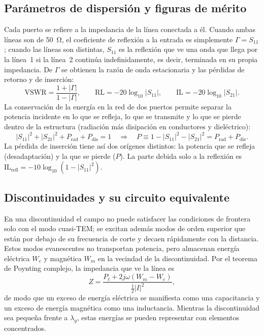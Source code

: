 \documentclass[11pt,letterpaper]{article}
\begin{document}
\subsection{Parámetros de dispersión y figuras de mérito}
\label{sec:sparam}
Cada puerto se refiere a la impedancia de la línea conectada a él. Cuando ambas líneas son de \SI{50}{\ohm}, el coeficiente de reflexión a la entrada es simplemente $\Gamma=S_{11}$; cuando las líneas son distintas, $S_{11}$ es la reflexión que ve una onda que llega por la línea~1 si la línea~2 continúa indefinidamente, es decir, terminada en su propia impedancia. De $\Gamma$ se obtienen la razón de onda estacionaria y las pérdidas de retorno y de inserción:
\begin{equation}
\mathrm{VSWR} = \frac{1+|\Gamma|}{1-|\Gamma|}, \qquad
\mathrm{RL} = -20\log_{10}|S_{11}|, \qquad
\mathrm{IL} = -20\log_{10}|S_{21}|.
\label{eq:merito}
\end{equation}
La conservación de la energía en la red de dos puertos permite separar la potencia incidente en lo que se refleja, lo que se transmite y lo que se pierde dentro de la estructura (radiación más disipación en conductores y dieléctrico):
\begin{equation}
|S_{11}|^2 + |S_{21}|^2 + P_{\mathrm{rad}} + P_{\mathrm{dis}} = 1
\quad\Longrightarrow\quad
P \equiv 1-|S_{11}|^2-|S_{21}|^2 = P_{\mathrm{rad}} + P_{\mathrm{dis}}.
\label{eq:balance}
\end{equation}
La pérdida de inserción tiene así dos orígenes distintos: la potencia que se refleja (desadaptación) y la que se pierde ($P$). La parte debida solo a la reflexión es $\mathrm{IL}_{\mathrm{refl}}=-10\log_{10}\left(1-|S_{11}|^2\right)$.

\subsection{Discontinuidades y su circuito equivalente}
En una discontinuidad el campo no puede satisfacer las condiciones de frontera solo con el modo cuasi-TEM; se excitan además modos de orden superior que están por debajo de su frecuencia de corte y decaen rápidamente con la distancia. Estos modos evanescentes no transportan potencia, pero almacenan energía eléctrica $W_e$ y magnética $W_m$ en la vecindad de la discontinuidad. Por el teorema de Poynting complejo, la impedancia que ve la línea es \cite{pozar}
\begin{equation}
Z = \frac{P_\ell + 2j\omega\left(W_m - W_e\right)}{\frac{1}{2}|I|^2},
\label{eq:poynting}
\end{equation}
de modo que un exceso de energía eléctrica se manifiesta como una capacitancia y un exceso de energía magnética como una inductancia. Mientras la discontinuidad sea pequeña frente a $\lambda_g$, estas energías se pueden representar con elementos concentrados.
\end{document}
